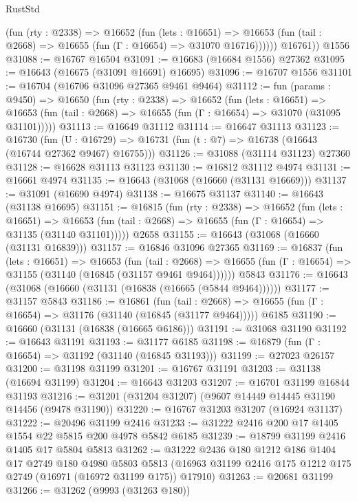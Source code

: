 \begin{lexlean}{RustStd}
\begin{coremodule}
            (fun (rty : @2338) =>
            @16652
              (fun (lets : @16651) =>
              @16653 (fun (tail : @2668) => @16655 (fun (Γ : @16654) => @31070 @16716))))))
        @16761))
    @1556
@31088 := @16767 @16504
@31091 := @16683 (@16684 @1556) @27362
@31095 := @16643 (@16675 (@31091 @16691) @16695)
@31096 := @16707 @1556
@31101 := @16704 (@16706 @31096 @27365 @9461 @9464)
@31112 := fun (params : @9450) =>
  @16650
    (fun (rty : @2338) =>
    @16652
      (fun (lets : @16651) =>
      @16653 (fun (tail : @2668) => @16655 (fun (Γ : @16654) => @31070 (@31095 @31101)))))
@31113 := @16649 @31112
@31114 := @16647 @31113
@31123 := @16730
    (fun (U : @16729) => @16731 (fun (t : @7) => @16738 (@16643 (@16744 @27362 @9467) @16755)))
@31126 := @31088 (@31114 @31123) @27360
@31128 := @16628 @31113 @31123
@31130 := @16812 @31112 @4974
@31131 := @16661 @4974
@31135 := @16643 (@31068 (@16660 (@31131 @16669)))
@31137 := @31091 (@16690 @4974)
@31138 := @16675 @31137
@31140 := @16643 (@31138 @16695)
@31151 := @16815
    (fun (rty : @2338) =>
    @16652
      (fun (lets : @16651) =>
      @16653 (fun (tail : @2668) => @16655 (fun (Γ : @16654) => @31135 (@31140 @31101)))))
    @2658
@31155 := @16643 (@31068 (@16660 (@31131 @16839)))
@31157 := @16846 @31096 @27365
@31169 := @16837
    (fun (lets : @16651) =>
    @16653
      (fun (tail : @2668) =>
      @16655 (fun (Γ : @16654) => @31155 (@31140 (@16845 (@31157 @9461 @9464))))))
    @5843
@31176 := @16643 (@31068 (@16660 (@31131 (@16838 (@16665 (@5844 @9464))))))
@31177 := @31157 @5843
@31186 := @16861
    (fun (tail : @2668) => @16655 (fun (Γ : @16654) => @31176 (@31140 (@16845 (@31177 @9464)))))
    @6185
@31190 := @16660 (@31131 (@16838 (@16665 @6186)))
@31191 := @31068 @31190
@31192 := @16643 @31191
@31193 := @31177 @6185
@31198 := @16879 (fun (Γ : @16654) => @31192 (@31140 (@16845 @31193)))
@31199 := @27023 @26157
@31200 := @31198 @31199
@31201 := @16767 @31191
@31203 := @31138 (@16694 @31199)
@31204 := @16643 @31203
@31207 := @16701 @31199 @16844 @31193
@31216 := @31201 (@31204 @31207) (@9607 @14449 @14445 @31190 @14456 (@9478 @31190))
@31220 := @16767 @31203 @31207 (@16924 @31137)
@31222 := @20496 @31199 @2416
@31233 := @31222 @2416 @200 @17 @1405 @1554 @22 @5815 @200 @4978 @5842 @6185
@31239 := @18799 @31199 @2416 @1405 @17 @5804 @5813
@31262 := @31222
    @2436
    @180
    @1212
    @186
    @1404
    @17
    @2749
    @180
    @4980
    @5803
    @5813
    (@16963 @31199 @2416 @175 @1212 @175 @2749 (@16971 (@16972 @31199 @175)) @17910)
@31263 := @20681 @31199
@31266 := @31262 (@9993 (@31263 @180))

\end{coremodule}
\end{lexlean}
